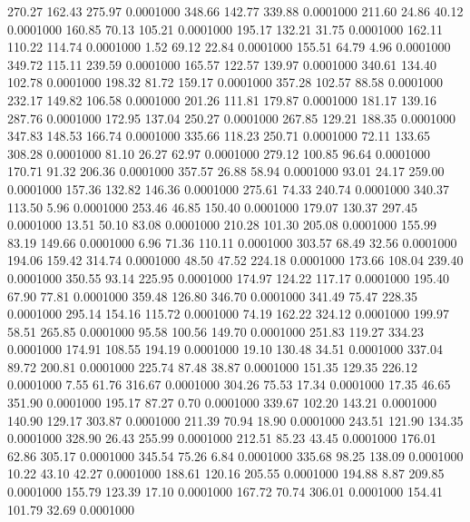  270.27  162.43  275.97   0.0001000
 348.66  142.77  339.88   0.0001000
 211.60   24.86   40.12   0.0001000
 160.85   70.13  105.21   0.0001000
 195.17  132.21   31.75   0.0001000
 162.11  110.22  114.74   0.0001000
   1.52   69.12   22.84   0.0001000
 155.51   64.79    4.96   0.0001000
 349.72  115.11  239.59   0.0001000
 165.57  122.57  139.97   0.0001000
 340.61  134.40  102.78   0.0001000
 198.32   81.72  159.17   0.0001000
 357.28  102.57   88.58   0.0001000
 232.17  149.82  106.58   0.0001000
 201.26  111.81  179.87   0.0001000
 181.17  139.16  287.76   0.0001000
 172.95  137.04  250.27   0.0001000
 267.85  129.21  188.35   0.0001000
 347.83  148.53  166.74   0.0001000
 335.66  118.23  250.71   0.0001000
  72.11  133.65  308.28   0.0001000
  81.10   26.27   62.97   0.0001000
 279.12  100.85   96.64   0.0001000
 170.71   91.32  206.36   0.0001000
 357.57   26.88   58.94   0.0001000
  93.01   24.17  259.00   0.0001000
 157.36  132.82  146.36   0.0001000
 275.61   74.33  240.74   0.0001000
 340.37  113.50    5.96   0.0001000
 253.46   46.85  150.40   0.0001000
 179.07  130.37  297.45   0.0001000
  13.51   50.10   83.08   0.0001000
 210.28  101.30  205.08   0.0001000
 155.99   83.19  149.66   0.0001000
   6.96   71.36  110.11   0.0001000
 303.57   68.49   32.56   0.0001000
 194.06  159.42  314.74   0.0001000
  48.50   47.52  224.18   0.0001000
 173.66  108.04  239.40   0.0001000
 350.55   93.14  225.95   0.0001000
 174.97  124.22  117.17   0.0001000
 195.40   67.90   77.81   0.0001000
 359.48  126.80  346.70   0.0001000
 341.49   75.47  228.35   0.0001000
 295.14  154.16  115.72   0.0001000
  74.19  162.22  324.12   0.0001000
 199.97   58.51  265.85   0.0001000
  95.58  100.56  149.70   0.0001000
 251.83  119.27  334.23   0.0001000
 174.91  108.55  194.19   0.0001000
  19.10  130.48   34.51   0.0001000
 337.04   89.72  200.81   0.0001000
 225.74   87.48   38.87   0.0001000
 151.35  129.35  226.12   0.0001000
   7.55   61.76  316.67   0.0001000
 304.26   75.53   17.34   0.0001000
  17.35   46.65  351.90   0.0001000
 195.17   87.27    0.70   0.0001000
 339.67  102.20  143.21   0.0001000
 140.90  129.17  303.87   0.0001000
 211.39   70.94   18.90   0.0001000
 243.51  121.90  134.35   0.0001000
 328.90   26.43  255.99   0.0001000
 212.51   85.23   43.45   0.0001000
 176.01   62.86  305.17   0.0001000
 345.54   75.26    6.84   0.0001000
 335.68   98.25  138.09   0.0001000
  10.22   43.10   42.27   0.0001000
 188.61  120.16  205.55   0.0001000
 194.88    8.87  209.85   0.0001000
 155.79  123.39   17.10   0.0001000
 167.72   70.74  306.01   0.0001000
 154.41  101.79   32.69   0.0001000
